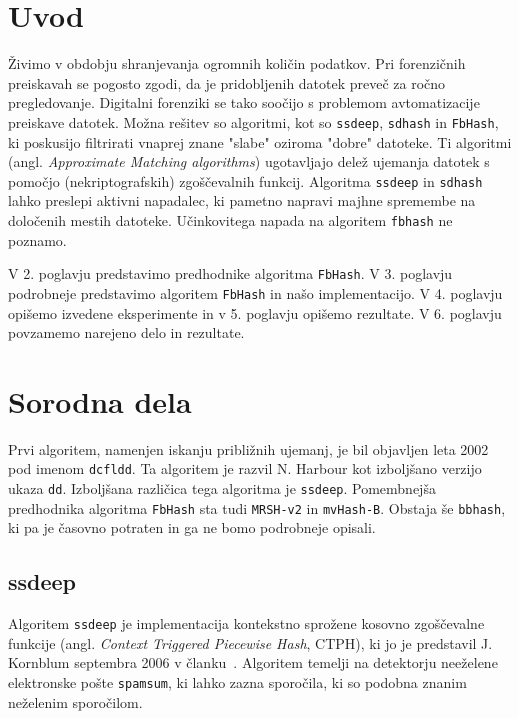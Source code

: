 \documentclass{acm_proc_article-sp}
\begin{document}
\section{Uvod}
Živimo v obdobju shranjevanja ogromnih količin podatkov. Pri forenzičnih preiskavah se pogosto zgodi, da je pridobljenih datotek preveč za ročno pregledovanje. Digitalni forenziki se tako soočijo s problemom avtomatizacije preiskave datotek. Možna rešitev so algoritmi, kot so \texttt{ssdeep}, \texttt{sdhash} in \texttt{FbHash}, ki poskusijo filtrirati vnaprej znane "slabe" oziroma "dobre" datoteke. Ti algoritmi (angl. \emph{Approximate Matching algorithms}) ugotavljajo delež ujemanja datotek s pomočjo (nekriptografskih) zgoščevalnih funkcij. Algoritma \texttt{ssdeep} in \texttt{sdhash} lahko preslepi aktivni napadalec, ki pametno napravi majhne spremembe na določenih mestih datoteke. Učinkovitega napada na algoritem \texttt{fbhash} ne poznamo.\cite{fbhash}

V 2. poglavju predstavimo predhodnike algoritma \texttt{FbHash}. V 3. poglavju podrobneje predstavimo algoritem \texttt{FbHash} in našo implementacijo. V 4. poglavju opišemo izvedene eksperimente in  v 5. poglavju opišemo rezultate. V 6. poglavju povzamemo narejeno delo in rezultate.

\section{Sorodna dela}
Prvi algoritem, namenjen iskanju približnih ujemanj, je bil objavljen leta 2002 pod imenom \texttt{dcfldd}. Ta algoritem je razvil N. Harbour kot izboljšano verzijo ukaza \texttt{dd}\cite{dcfldd}. Izboljšana različica tega algoritma je \texttt{ssdeep}. Pomembnejša predhodnika algoritma \texttt{FbHash} sta tudi \texttt{MRSH-v2} in \texttt{mvHash-B}. Obstaja še \texttt{bbhash}, ki pa je časovno potraten in ga ne bomo podrobneje opisali.

\subsection{ssdeep}
Algoritem \texttt{ssdeep} je implementacija kontekstno sprožene kosovno zgoščevalne funkcije (angl. \emph{Context Triggered Piecewise Hash}, CTPH), ki jo je predstavil J. Kornblum septembra 2006 v članku~\cite{kornblum:ctph}. Algoritem temelji na detektorju neeželene elektronske pošte \texttt{spamsum}, ki lahko zazna sporočila, ki so podobna znanim neželenim sporočilom.
\end{document}
